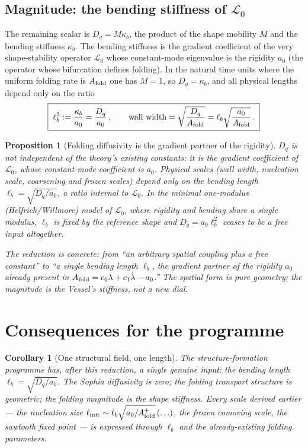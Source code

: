 \documentclass[11pt,a4paper,oneside]{book}
\newcommand{\note}[1]{\textcolor{black!65}{\emph{#1}}}
\newcommand{\Af}{A_{\rm fold}}
\newcommand{\Dq}{D_q}
\newcommand{\linit}{\ell_{\rm init}}
\newcommand{\kb}{\kappa_b}
\newcommand{\lb}{\ell_b}
\newcommand{\Lop}{\mathcal{L}_0}
\theoremstyle{plain}
\newtheorem{proposition}{Proposition}[chapter]
\newtheorem{corollary}{Corollary}[chapter]
\theoremstyle{definition}
\theoremstyle{remark}
\begin{document}
\subsection{Magnitude: the bending stiffness of $\Lop$}
The remaining scalar is $\Dq=M\kb$, the product of the shape mobility $M$ and the bending stiffness
$\kb$. The bending stiffness is the gradient coefficient of the very shape-stability operator
$\Lop$ whose constant-mode eigenvalue is the rigidity $a_0$ (the operator whose bifurcation defines
folding). In the natural time units where the uniform folding rate is $\Af$ one has $M=1$, so
$\Dq=\kb$, and all physical lengths depend only on the ratio
\begin{equation}
\boxed{\;\lb^{2}:=\frac{\kb}{a_0}=\frac{\Dq}{a_0}\,,\qquad
\text{wall width}=\sqrt{\frac{\Dq}{\Af}}=\lb\sqrt{\frac{a_0}{\Af}}\,.\;}
\end{equation}

\begin{proposition}[Folding diffusivity is the gradient partner of the rigidity]\label{transportconstants:prop:Dq}
$\Dq$ is not independent of the theory's existing constants: it is the gradient coefficient of $\Lop$,
whose constant-mode coefficient is $a_0$. Physical scales (wall width, nucleation scale, coarsening and
frozen scales) depend only on the bending length $\lb=\sqrt{\Dq/a_0}$, a ratio internal to $\Lop$. In the
minimal one-modulus (Helfrich/Willmore) model of $\Lop$, where rigidity and bending share a single
modulus, $\lb$ is fixed by the reference shape and $\Dq=a_0\lb^2$ ceases to be a free input altogether.
\end{proposition}

\note{The reduction is concrete: from ``an arbitrary spatial coupling plus a free constant'' to
``a single bending length $\lb$, the gradient partner of the rigidity $a_0$ already present in
$\Af=c_0\lambda+c_1\dot\lambda-a_0$.'' The spatial form is pure geometry; the magnitude is the Vessel's
stiffness, not a new dial.}

\section{Consequences for the programme}

\begin{corollary}[One structural field, one length]
The structure-formation programme has, after this reduction, a single genuine input: the bending length
$\lb=\sqrt{\Dq/a_0}$. The Sophia diffusivity is zero; the folding transport structure is geometric; the
folding magnitude is the shape stiffness. Every scale derived earlier --- the nucleation size
$\linit\sim\lb\sqrt{a_0/\Af^+}\,(\ldots)$, the frozen comoving scale, the sawtooth fixed point --- is
expressed through $\lb$ and the already-existing folding parameters.
\end{corollary}
\end{document}
